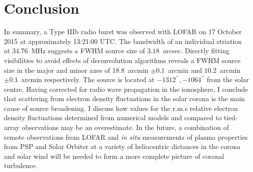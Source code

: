 \section{Conclusion}
In summary, a Type IIIb radio burst was observed with LOFAR on 17 October 2015 at approximately 13:21:00 UTC. The bandwidth of an individual striation at 34.76~MHz suggests a FWHM source size of $3.18$~arcsec. Directly fitting visibilities to avoid effects of deconvolution algorithms reveals a FWHM source size in the major and minor axes of $18.8$~arcmin $\pm 0.1$~arcmin and $10.2$~arcmin $\pm 0.1$~arcmin respectively. The source is located at $-1312^{\prime\prime}, -1064^{\prime\prime}$ from the solar centre. 
Having corrected for radio wave propagation in the ionosphere, I conclude that scattering from electron density fluctuations in the solar corona is the main cause of source broadening. I discuss how values for the r.m.s relative electron density fluctuations determined from numerical models and compared to tied-array observations may be an overestimate. 
In the future, a combination of remote observations from LOFAR and \textit{in situ} measurements of plasma properties from PSP and Solar Orbiter \citep{Muller2013,Muller2020} at a variety of heliocentric distances in the corona and solar wind will be needed to form a more complete picture of coronal turbulence.